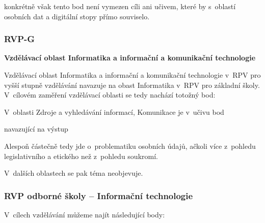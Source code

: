konkrétně však tento bod není vymezen cíli ani učivem, které by s~oblastí osobních dat a digitální stopy přímo souviselo.

\subsubsection*{RVP-G}

\textbf{Vzdělávací oblast Informatika a informační a komunikační technologie}

Vzdělávací oblast Informatika a informační a komunikační technologie v~RPV pro vyšší stupně vzdělávání navazuje na obast Informatika v~RPV pro základní školy. V~cílovém zaměření vzdělávací oblasti se tedy nachází totožný bod:

\begin{displayquote}
	\citep{rvp-g}
\end{displayquote}

V~oblasti Zdroje a vyhledávání informací, Komunikace je v~učivu bod

\begin{displayquote}
	\citep{rvp-g}
\end{displayquote}

navazující na výstup

\begin{displayquote}
	\citep{rvp-g}
\end{displayquote}

Alespoň částečně tedy jde o~problematiku osobních údajů, ačkoli více z~pohledu legislativního a etického než z~pohledu soukromí.

V~dalších oblastech se pak téma neobjevuje. 

\subsubsection*{RVP odborné školy -- Informační technologie}

V~cílech vzdělávání můžeme najít následující body:

\begin{displayquote}
	\citep{rvp-it}
\end{displayquote}

